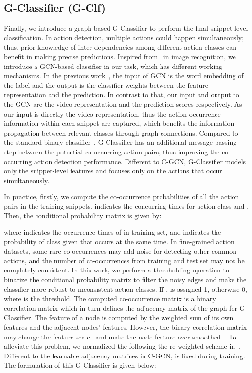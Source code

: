 \documentclass{bmvc2k}
\begin{document}
\subsection{G-Classifier (G-Clf)}
\label{sec:g-classifier}
Finally, we introduce a graph-based G-Classifier to perform the final snippet-level classification.
In action detection, multiple actions could happen simultaneously; thus, prior knowledge of inter-dependencies among different action classes can benefit in making precise predictions. {Inspired from~\cite{chen2019multi} in image recognition, we introduce a GCN-based classifier in our task, which has different working mechanisms. 
In the previous work~\cite{chen2019multi}, the input of GCN is the word embedding of the label and the output is the classifier weights between the feature representation and the prediction.
In contrast to that, our input and output to the GCN are the video representation and the prediction scores respectively.  
As our input is directly the video representation, thus the action occurrence information within each snippet are captured, which benefits the information propagation between relevant classes through graph connections. Compared to the standard binary classifier~\cite{superevent}, G-Classifier has an additional message passing step between the potential co-occurring action pairs, thus improving the co-occurring action detection performance.} 
Different to C-GCN, G-Classifier models only the snippet-level features and focuses only on the actions that occur simultaneously.  

In practice, firstly, we compute the co-occurrence probabilities of all the action pairs in the training snippets.  indicates the concurring times for action class  and .
Then, the conditional probability matrix  is given by:

where  indicates the occurrence times of  in training set, and  indicates the probability of class  given that  occurs at the same time.
In fine-grained action datasets, some rare co-occurrences may add noise for detecting other common actions, and the number of co-occurrences from training and test set may not be completely consistent. In this work, we perform a thresholding operation to binarize the conditional probability matrix to filter the noisy edges and make the classifier more robust to inconsistent action classes. If ,  is assigned 1, otherwise 0, where  is the threshold. The computed co-occurrence matrix  is a binary correlation matrix which in turn defines the adjacency matrix of the graph for G-Classifier. 
The feature of a node is computed by the weighted sum of its own features and the adjacent nodes’ features. However, the binary correlation matrix may change the feature scale~\cite{kipf2016semi} and make the node feature over-smoothed~\cite{li2018deeper}. To alleviate this problem, we normalized the  following the re-weighted scheme in~\cite{chen2019multi}.
Different to the learnable adjacency matrices in C-GCN,  is fixed during training.
The formulation of this G-Classifier is given below:
\end{document}
